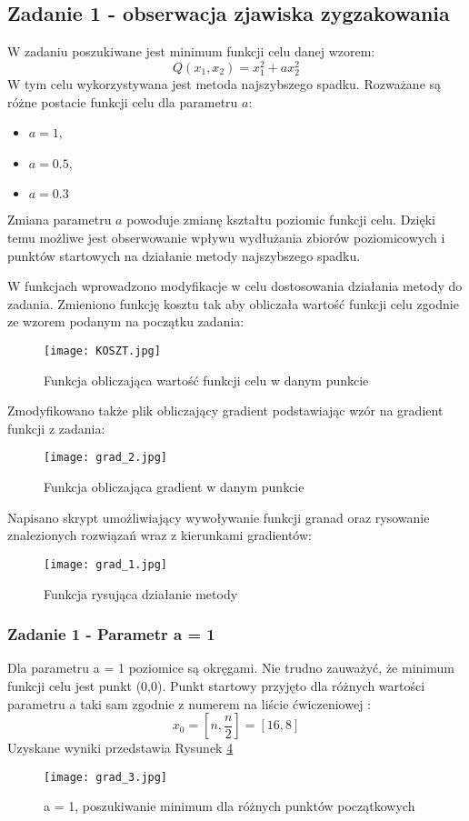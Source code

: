 \documentclass[a4paper,15pt]{article}
\begin{document}
\subsection{Zadanie 1 - obserwacja zjawiska zygzakowania}
W zadaniu poszukiwane jest minimum funkcji celu danej wzorem:
\begin{equation*}
Q(x_{1},x_{2})=x_{1}^{2}+ax_{2}^{2}
\end{equation*}
W tym celu wykorzystywana jest metoda najszybszego spadku. Rozważane są różne postacie funkcji celu dla parametru \(a\):
\begin{itemize}
\item \(a=1\),
\item \(a=0.5\),
\item \(a=0.3\)
\end{itemize}
Zmiana parametru \(a\) powoduje zmianę kształtu poziomic funkcji celu. Dzięki temu możliwe jest obserwowanie wpływu wydłużania zbiorów poziomicowych i punktów startowych na działanie metody najszybszego spadku. \par
W funkcjach wprowadzono modyfikacje w celu dostosowania działania metody do zadania. Zmieniono funkcję kosztu tak aby obliczała wartość funkcji celu zgodnie ze wzorem podanym na początku zadania: 
\begin{figure}[H]
\centerline{\texttt{[image: KOSZT.jpg]}}
\centering
\caption{Funkcja obliczająca wartość funkcji celu w danym punkcie}
\label{fig:KOSZT}
\end{figure}
Zmodyfikowano także plik obliczający gradient podstawiając wzór na gradient funkcji z zadania:
\begin{figure}[H]
\centerline{\texttt{[image: grad\_2.jpg]}}
\centering
\caption{Funkcja obliczająca gradient w danym punkcie}
\label{fig:grad_2}
\end{figure}
Napisano skrypt umożliwiający wywoływanie funkcji granad oraz rysowanie znalezionych rozwiązań wraz z kierunkami gradientów:
\begin{figure}[H]
\centerline{\texttt{[image: grad\_1.jpg]}}
\centering
\caption{Funkcja rysująca działanie metody}
\label{fig:grad_1}
\end{figure}
\newpage

\subsubsection{Zadanie 1 - Parametr a = 1}
Dla parametru a = 1 poziomice są okręgami. Nie trudno zauważyć, że minimum funkcji celu jest punkt (0,0). Punkt startowy przyjęto dla różnych wartości parametru a taki sam zgodnie z numerem na liście ćwiczeniowej : 
\begin{equation*}
x_{0}=\left[n,\frac{n}{2}\right]=\left[16,8\right]
\end{equation*}
Uzyskane wyniki przedstawia Rysunek \ref{fig:grad_3}
\begin{figure}[H]
\centerline{\texttt{[image: grad\_3.jpg]}}
\centering
\caption{a = 1, poszukiwanie minimum dla różnych punktów początkowych}
\label{fig:grad_3}
\end{figure}
\end{document}
